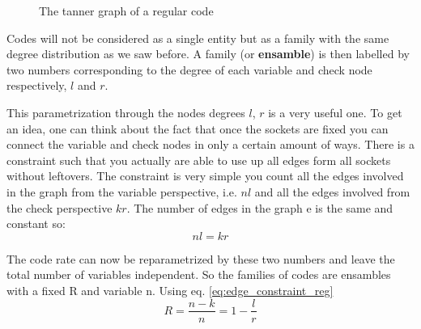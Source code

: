 \begin{figure}[h]
\begin{center}
	\end{center}
	\caption{The tanner graph of a regular code}
	\label{fig:TannerRegular}
\end{figure}
Codes will not be considered as a single entity but as a family with the same degree distribution as we saw before. A family (or \textbf{ ensamble}) is then labelled by two numbers corresponding to the degree of each variable and check node respectively, $l$ and $r$.

This parametrization through the nodes degrees $l$, $r$ is a very useful one. To get an idea, one can think about the fact that once the sockets are fixed you can connect the variable and check nodes in only a certain amount of ways. There is a constraint such that you actually are able to use up all edges form all sockets without leftovers. The constraint is very simple you count all the edges involved in the graph from the variable perspective, i.e. $nl$ and all the edges involved from the check perspective $kr$. The number of edges in the graph e is the same and constant so:
\begin{equation}
	nl = kr
\label{eq:edge_constraint_reg}
\end{equation}

The code rate can now be reparametrized by these two numbers and leave the total number of variables independent. So the families of codes are ensambles with a fixed R and variable n.
Using eq. \ref{eq:edge_constraint_reg}
\begin{equation}
	R = \frac{n-k}{n} = 1 -\frac{l}{r}
\end{equation}

